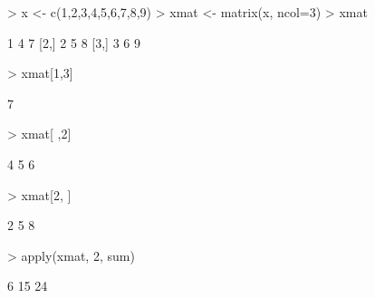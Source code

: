 \begin{Schunk}
\begin{Sinput}
> x <- c(1,2,3,4,5,6,7,8,9)
> xmat <- matrix(x, ncol=3)
> xmat
\end{Sinput}
\begin{Soutput}
     [,1] [,2] [,3]
[1,]    1    4    7
[2,]    2    5    8
[3,]    3    6    9
\end{Soutput}
\begin{Sinput}
> xmat[1,3]
\end{Sinput}
\begin{Soutput}
[1] 7
\end{Soutput}
\begin{Sinput}
> xmat[ ,2]
\end{Sinput}
\begin{Soutput}
[1] 4 5 6
\end{Soutput}
\begin{Sinput}
> xmat[2, ]
\end{Sinput}
\begin{Soutput}
[1] 2 5 8
\end{Soutput}
\begin{Sinput}
> apply(xmat, 2, sum)
\end{Sinput}
\begin{Soutput}
[1]  6 15 24
\end{Soutput}
\end{Schunk}
